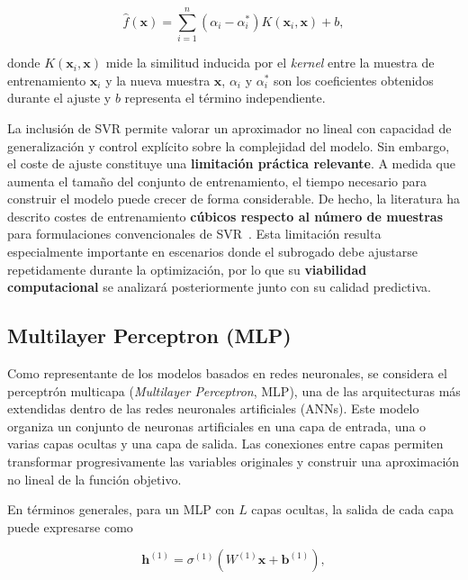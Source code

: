 \begin{equation}
    \hat{f}(\mathbf{x})
    =
    \sum_{i=1}^{n}
    \left(
    \alpha_i - \alpha_i^{*}
    \right)
    K
    \left(
    \mathbf{x}_i,
    \mathbf{x}
    \right)
    +
    b,
\end{equation}

donde \(K(\mathbf{x}_i,\mathbf{x})\) mide la similitud inducida por el
\textit{kernel} entre la muestra de entrenamiento \(\mathbf{x}_i\) y la nueva muestra \(\mathbf{x}\), \(\alpha_i\) y \(\alpha_i^{*}\) son los coeficientes obtenidos durante el ajuste y \(b\) representa el término independiente.

La inclusión de SVR permite valorar un aproximador no lineal con capacidad de generalización y control explícito sobre la complejidad del modelo. Sin embargo, el coste de ajuste constituye una \textbf{limitación práctica relevante}. A medida que aumenta el tamaño del conjunto de entrenamiento, el tiempo necesario para construir el modelo puede crecer de forma considerable. De hecho, la literatura ha descrito costes de entrenamiento \textbf{cúbicos respecto al número de muestras} para formulaciones convencionales de SVR~\cite{wang2007reducing}. Esta limitación resulta especialmente importante en escenarios donde el subrogado debe ajustarse repetidamente durante la optimización, por lo que su \textbf{viabilidad computacional} se analizará posteriormente junto con su calidad predictiva.


\subsection{Multilayer Perceptron (MLP)}

Como representante de los modelos basados en redes neuronales, se considera el perceptrón multicapa (\textit{Multilayer Perceptron}, MLP), una de las arquitecturas más extendidas dentro de las redes neuronales artificiales (ANNs). Este modelo organiza un conjunto de neuronas artificiales en una capa de entrada, una o varias capas ocultas y una capa de salida. Las conexiones entre capas permiten transformar progresivamente las variables originales y construir una aproximación no lineal de la función objetivo.

En términos generales, para un MLP con \(L\) capas ocultas, la salida de cada capa puede expresarse como

\begin{equation}
    \mathbf{h}^{(1)}
    =
    \sigma^{(1)}
    \left(
    W^{(1)}\mathbf{x}
    +
    \mathbf{b}^{(1)}
    \right),
\end{equation}

